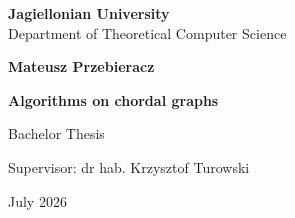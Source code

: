 \begin{titlepage}
\begin{center}

\large
\textbf{Jagiellonian University}\\
Department of Theoretical Computer Science\\

\vspace{1.5cm}

\Large
\textbf{Mateusz Przebieracz}

\vspace*{2cm}

\textbf{\LARGE Algorithms on chordal graphs} 

\vspace{0.5cm}
\large

\vfill
\Large
Bachelor Thesis

\vfill
\Large
Supervisor: dr hab. Krzysztof Turowski

\vspace{0.8cm}

July 2026
		
\end{center}
\end{titlepage}